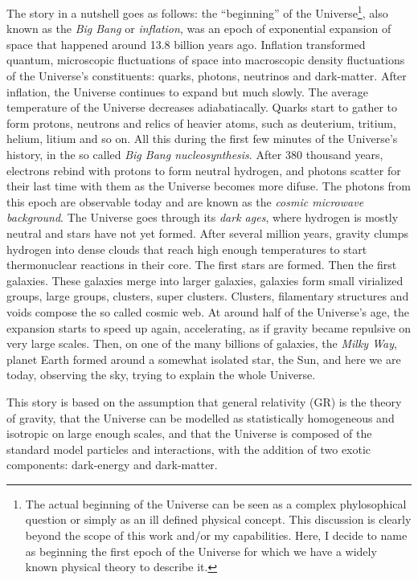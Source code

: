     The story in a nutshell goes as follows: the ``beginning''
    of the Universe\footnote{ The actual beginning of 
    the Universe can be seen as a complex phylosophical question or simply as an 
    ill defined physical concept. This discussion is clearly beyond the scope of this work 
    and/or my capabilities. Here, I decide to name as beginning the first epoch of the Universe
    for which we have a widely known physical theory to describe it.}, 
    also known as the \emph{Big Bang} or \emph{inflation}, was an epoch of exponential 
    expansion of space that happened around 13.8 billion years ago. 
    Inflation transformed quantum, microscopic fluctuations of space
    into macroscopic density fluctuations of the Universe's constituents:
    quarks, photons, neutrinos and dark-matter. 
    After inflation, the Universe continues to expand but much slowly. 
    The average temperature of the Universe decreases adiabatiacally. 
    Quarks start to gather to form protons, neutrons and relics of heavier atoms, 
    such as deuterium, tritium, helium, litium and so on. 
    All this during the first few minutes of the Universe's history, in the so called
    \emph{Big Bang nucleosynthesis}. 
    After 380 thousand years, electrons rebind with protons to form neutral 
    hydrogen, and photons scatter for their last time with them as the Universe becomes
    more difuse. 
    The photons from this epoch are observable today and are known as the 
    \emph{cosmic microwave background}. 
    The Universe goes through its \emph{dark ages}, where hydrogen is mostly neutral and 
    stars have not yet formed. 
    After several million years, gravity clumps hydrogen into dense clouds that reach 
    high enough temperatures to start thermonuclear reactions in their core. 
    The first stars are formed. Then the first galaxies. These galaxies merge into larger 
    galaxies, galaxies form small virialized groups, large groups, clusters, super clusters. 
    Clusters, filamentary structures and voids compose the so called cosmic web. 
    At around half of the Universe's age, the expansion starts to speed up again,
    accelerating, as if gravity became repulsive on very large scales. 
    Then, on one of the many billions of galaxies, the \emph{Milky Way}, 
    planet Earth formed around a somewhat isolated star, the Sun, 
    and here we are today, observing the sky, trying to explain the whole Universe. 

    This story is based on the assumption that general relativity (GR) is the theory of gravity, 
    that the Universe can be modelled as statistically homogeneous and isotropic on large enough
    scales, and that the Universe is composed of the standard model particles and interactions, 
    with the addition of two exotic components: dark-energy and dark-matter. 

